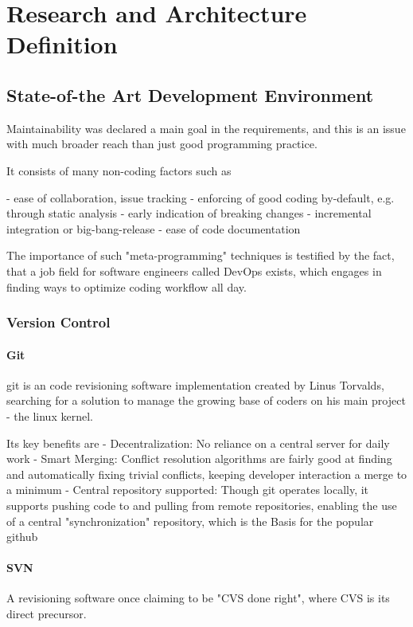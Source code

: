 \chapter{Research and Architecture Definition}

\section{State-of-the Art Development Environment}

Maintainability was declared a main goal in the requirements, and this is an issue with much broader reach than just good programming practice.

It consists of many non-coding factors such as

- ease of collaboration, issue tracking
- enforcing of good coding by-default, e.g. through static analysis
- early indication of breaking changes
- incremental integration or big-bang-release
- ease of code documentation

The importance of such "meta-programming" techniques is testified by the fact, that a job field for software engineers called \gls{DevOps} exists, which engages in finding ways to optimize coding workflow all day.

\subsection{Version Control}

\subsubsection{Git}
\gls{git} is an code revisioning software implementation created by Linus Torvalds, searching for a solution to manage the growing base of coders on his main project - the \gls{linux} kernel.

Its key benefits are
- Decentralization: No reliance on a central server for daily work
- Smart Merging: Conflict resolution algorithms are fairly good at finding and automatically fixing trivial conflicts, keeping developer interaction a merge to a minimum
- Central repository supported: Though git operates locally, it supports pushing code to and pulling from remote repositories, enabling the use of a central "synchronization" repository, which is the Basis for the popular \gls{github} 

\subsubsection{SVN}
A revisioning software once claiming to be "CVS done right", where CVS is its direct precursor.

